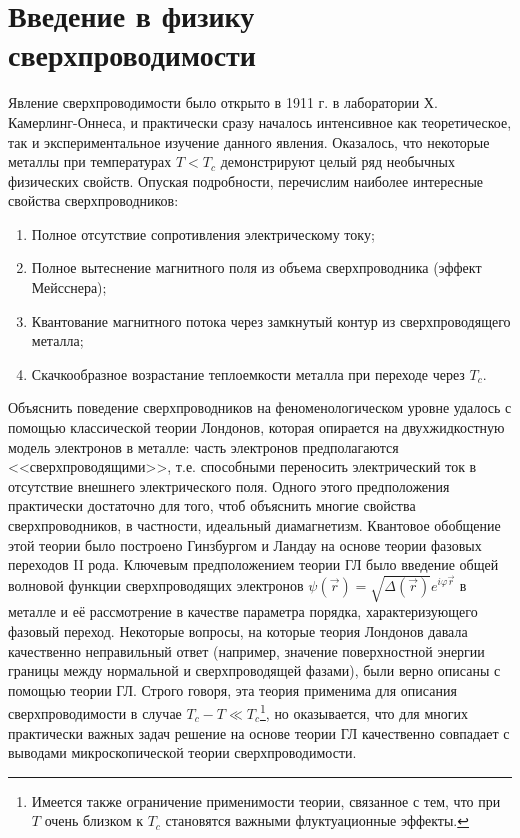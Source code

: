 \section{Введение в физику сверхпроводимости} \label{s1_sc_phys}
Явление сверхпроводимости было открыто в 1911 г. в лаборатории Х. Камерлинг-Оннеса, и практически сразу началось интенсивное как теоретическое, так и экспериментальное изучение данного явления. Оказалось, что некоторые металлы при температурах $T<T_c$ демонстрируют целый ряд необычных физических свойств. Опуская подробности, перечислим наиболее интересные свойства сверхпроводников:
\begin{enumerate}
	\item Полное отсутствие сопротивления электрическому току;
	\item Полное вытеснение магнитного поля из объема сверхпроводника (эффект Мейсснера);
	\item Квантование магнитного потока через замкнутый контур из сверхпроводящего металла;
	\item Скачкообразное возрастание теплоемкости металла при переходе через $T_c$.
\end{enumerate}	
Объяснить поведение сверхпроводников на феноменологическом уровне удалось с помощью классической теории Лондонов, которая опирается на двухжидкостную модель электронов в металле: часть электронов предполагаются <<сверхпроводящими>>, т.е. способными переносить электрический ток в отсутствие внешнего электрического поля. Одного этого предположения практически достаточно для того, чтоб объяснить многие свойства сверхпроводников, в частности, идеальный диамагнетизм. Квантовое обобщение этой теории было построено Гинзбургом и Ландау на основе теории фазовых переходов II рода. Ключевым предположением теории ГЛ было введение общей волновой функции сверхпроводящих электронов $\psi(\vec{r}) = \sqrt{\Delta(\vec{r})} e^{i\varphi{\vec{r}}}$ в металле и её рассмотрение в качестве параметра порядка, характеризующего фазовый переход. Некоторые вопросы, на которые теория Лондонов давала качественно неправильный ответ (например, значение поверхностной энергии границы между нормальной и сверхпроводящей фазами), были верно описаны с помощью теории ГЛ. Строго говоря, эта теория применима для описания сверхпроводимости в случае $T_c-T \ll T_c$\footnote[1]{Имеется также ограничение применимости теории, связанное с тем, что при $T$ очень близком к $T_c$ становятся важными флуктуационные эффекты.}, но оказывается, что для многих практически важных задач решение на основе теории ГЛ качественно совпадает с выводами микроскопической теории сверхпроводимости.

